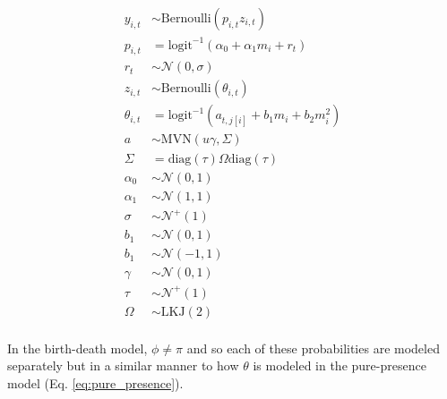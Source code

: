 \documentclass[12pt,letterpaper]{article}
\begin{document}
\begin{equation}
  \begin{aligned}
    y_{i, t} &\sim \text{Bernoulli}(p_{i, t} z_{i, t}) \\
    p_{i, t} &= \text{logit}^{-1}(\alpha_{0} + \alpha_{1} m_{i} + r_{t}) \\ 
    r_{t} &\sim \mathcal{N}(0, \sigma) \\
    z_{i, t} &\sim \text{Bernoulli}(\theta_{i, t}) \\
    \theta_{i, t} &= \text{logit}^{-1}(a_{t, j[i]} + b_{1} m_{i} + b_{2} m_{i}^{2}) \\
    a &\sim \text{MVN}(u \gamma, \Sigma) \\
    \Sigma &= \text{diag}(\tau) \Omega \text{diag}(\tau) \\
    \alpha_{0} &\sim \mathcal{N}(0, 1) \\
    \alpha_{1} &\sim \mathcal{N}(1, 1) \\
    \sigma &\sim \mathcal{N}^{+}(1) \\
    b_{1} &\sim \mathcal{N}(0, 1) \\
    b_{1} &\sim \mathcal{N}(-1, 1) \\
    \gamma &\sim \mathcal{N}(0, 1) \\
    \tau &\sim \mathcal{N}^{+}(1) \\
    \Omega &\sim \text{LKJ}(2) \\
  \end{aligned}
  \label{eq:pure_presence}
\end{equation}


In the birth-death model, \(\phi \neq \pi\) and so each of these probabilities are modeled separately but in a similar manner to how \(\theta\) is modeled in the pure-presence model (Eq. \ref{eq:pure_presence}). 



\end{document}
